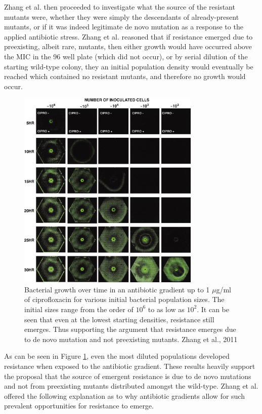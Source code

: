 \documentclass[a4paper,12pt]{article}
\begin{document}
Zhang et al. then proceeded to investigate what the source of the resistant mutants were, whether they were simply the descendants of already-present
mutants, or if it was indeed legitimate de novo mutation as a response to the applied antibiotic stress.  Zhang et al. reasoned that if resistance emerged due to 
preexisting, albeit rare, mutants, then either growth would have occurred above the MIC in the 96 well plate (which did not occur), or by serial dilution of the 
starting wild-type colony, they  an initial population density would eventually be reached which contained no resistant mutants, and therefore no growth would occur.


\begin{figure}[H]
 \centering
 \includegraphics[height=9.6cm]{F2-large}
 \caption{Bacterial growth over time in an antibiotic gradient up to 1 $\mu$g/ml of ciprofloxacin for various initial bacterial population sizes.  
 The initial sizes range from the order of $10^6$ to as low as $10^2$.  It can be seen that even at the lowest starting densities, resistance still emerges.
 Thus supporting the argument that resistance emerges due to de novo mutation and not preexisting mutants.  Zhang et al., 2011}
 \label{fig:Zhang-gradient-inital-pop-sizes}
\end{figure}


As can be seen in Figure \ref{fig:Zhang-gradient-inital-pop-sizes}, even the most diluted populations developed resistance when exposed to the antibiotic gradient.  
These results heavily support the proposal that the source of emergent resistance is due to de novo mutations and not from preexisting mutants distributed amongst the 
wild-type.  Zhang et al. offered the following explanation as to why antibiotic gradients allow for such prevalent opportunities for resistance to emerge. 
\end{document}
